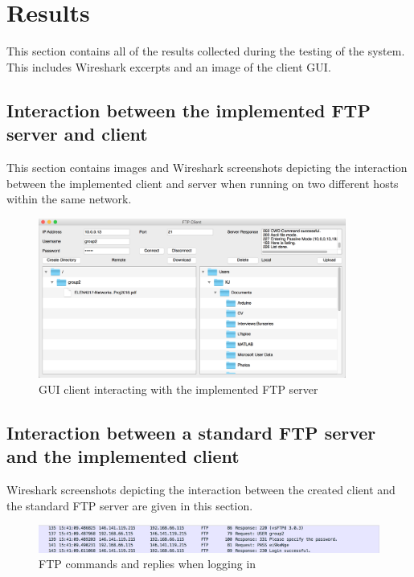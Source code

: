 \documentclass[10pt,twocolumn]{witseiepaper}
\begin{document}
\begin{appendix}
\begin{longtable}{|p{2cm}|p{7cm}|p{7cm}|}
\end{longtable}
\setcounter{figure}{0} 
\renewcommand{\thefigure}
{C\arabic{figure}}
\section{Results}
This section contains all of the results collected during the testing of the system. This includes Wireshark excerpts and an image of the client GUI.

\subsection{Interaction between the implemented FTP server and client}
This section contains images and Wireshark screenshots depicting the interaction between the implemented client and server when running on two different hosts within the same network.
 
\begin{figure}[h]
	\centering
	\includegraphics[width=0.9\textwidth]{gui.png}
	\caption{GUI client interacting with the implemented FTP server}
	\raggedright
	\label{fig:gui}	
\end{figure}

\subsection{Interaction between a standard FTP server and the implemented client} \label{sec:ourClientWitsServer}

Wireshark screenshots depicting the interaction between the created client and the standard FTP server are given in this section.

\begin{figure}[h]
	\centering
	\includegraphics[width=1\textwidth]{loginWits.png}
	\caption{FTP commands and replies when logging in}
	\raggedright
	\label{fig:loginWits}	
\end{figure}


\end{appendix}
\end{document}
